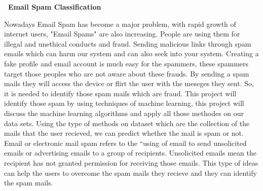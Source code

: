 \documentclass[a4paper]{article}
\begin{document}
  
\begin{center}  
\begin{large}  
\textbf{\ Email Spam Classification}\\  
\end{large}  
  
\end{center}  
  
  Nowadays Email Spam has become a major problem, with rapid growth of internet users, "Email Spams" are also increasing. People are using them for illegal and unethical conducts and fraud. Sending malicious links through spam emails which can harm our system and can also seek into your system. Creating a fake profile and email account is much easy for the spammers, these spammers target those peoples who are not aware about these frauds. By sending a spam mails they will access the device or flirt the user with the meseges they sent. So, it is needed to identify those spam mails which are fraud. This project will identify those spam by using techniques of machine learning, this project will discuss the machine learning algorithms and apply all those methodes on our data sets. Using the type of methods on dataset which are the collection of the mails that the user recieved, we can predict whether the mail is spam or not.  
Email or electronic mail spam refers to the “using of email to send unsolicited emails or advertising emails to a group of recipients. Unsolicited emails mean the recipient has not granted permission for receiving those emails. This type of ideas can help the users to overcome the spam mails they recieve and they can identify the spam mails. 
\end{document}
